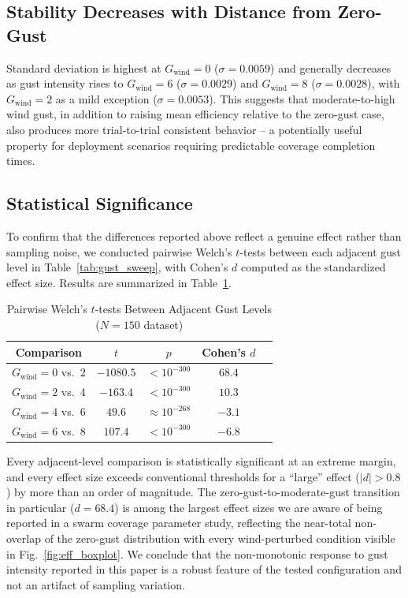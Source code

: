 \documentclass[10pt,journal]{IEEEtran}
\begin{document}
\subsection{Stability Decreases with Distance from Zero-Gust}
Standard deviation is highest at $G_{\text{wind}}=0$ ($\sigma=0.0059$) and
generally decreases as gust intensity rises to $G_{\text{wind}}=6$
($\sigma=0.0029$) and $G_{\text{wind}}=8$ ($\sigma=0.0028$), with
$G_{\text{wind}}=2$ as a mild exception ($\sigma=0.0053$). This suggests
that moderate-to-high wind gust, in addition to raising mean efficiency
relative to the zero-gust case, also produces more trial-to-trial
consistent behavior -- a potentially useful property for deployment
scenarios requiring predictable coverage completion times.

\subsection{Statistical Significance}
\label{sec:stats}
To confirm that the differences reported above reflect a genuine effect
rather than sampling noise, we conducted pairwise Welch's $t$-tests between
each adjacent gust level in Table~\ref{tab:gust_sweep}, with Cohen's $d$
computed as the standardized effect size. Results are summarized in
Table~\ref{tab:ttests}.

\begin{table}[t]
\centering
\caption{Pairwise Welch's $t$-tests Between Adjacent Gust Levels ($N=150$ dataset)}
\label{tab:ttests}
\begin{tabular}{@{}ccccc@{}}
\toprule
Comparison & $t$ & $p$ & Cohen's $d$ \\
\midrule
$G_{\text{wind}}{=}0$ vs.\ $2$ & $-1080.5$ & $<10^{-300}$ & $68.4$ \\
$G_{\text{wind}}{=}2$ vs.\ $4$ & $-163.4$ & $<10^{-300}$ & $10.3$ \\
$G_{\text{wind}}{=}4$ vs.\ $6$ & $49.6$ & $\approx10^{-268}$ & $-3.1$ \\
$G_{\text{wind}}{=}6$ vs.\ $8$ & $107.4$ & $<10^{-300}$ & $-6.8$ \\
\bottomrule
\end{tabular}
\end{table}

Every adjacent-level comparison is statistically significant at an
extreme margin, and every effect size exceeds conventional thresholds for
a ``large'' effect ($|d|>0.8$) by more than an order of magnitude. The
zero-gust-to-moderate-gust transition in particular ($d=68.4$) is among
the largest effect sizes we are aware of being reported in a swarm
coverage parameter study, reflecting the near-total non-overlap of the
zero-gust distribution with every wind-perturbed condition visible in
Fig.~\ref{fig:eff_boxplot}. We conclude that the non-monotonic response to
gust intensity reported in this paper is a robust feature of the tested
configuration and not an artifact of sampling variation.
\end{document}
